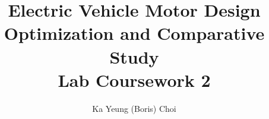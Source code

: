 




\title{
Electric Vehicle Motor Design Optimization and Comparative Study\\
\Large Lab Coursework 2
}
\author{Ka Yeung (Boris) Choi}
\maketitle


\tableofcontents
\listoffigures

\newpage

